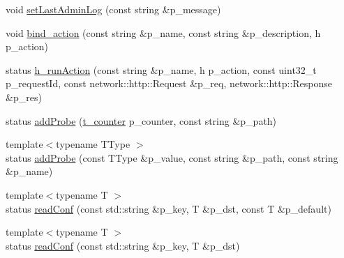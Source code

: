 \begin{DoxyCompactItemize}
\item 
void \hyperlink{classxtd_1_1servers_1_1app_1_1HttpServer_a9247cbc7930939b40df98a20167007c3}{set\+Last\+Admin\+Log} (const string \&p\+\_\+message)
\item 
void \hyperlink{classxtd_1_1servers_1_1app_1_1HttpServer_a981ab09b5f746a0cb7372816aede1115}{bind\+\_\+action} (const string \&p\+\_\+name, const string \&p\+\_\+description, h p\+\_\+action)
\item 
status \hyperlink{classxtd_1_1servers_1_1app_1_1HttpServer_a89a77d0dd8391a54b9560d2a32ab5ec6}{h\+\_\+run\+Action} (const string \&p\+\_\+name, h p\+\_\+action, const uint32\+\_\+t p\+\_\+request\+Id, const network\+::http\+::\+Request \&p\+\_\+req, network\+::http\+::\+Response \&p\+\_\+res)
\item 
status \hyperlink{classxtd_1_1servers_1_1app_1_1HttpServer_a0ff20a40a0e31dbb1e82be87be0e255f}{add\+Probe} (\hyperlink{classxtd_1_1servers_1_1app_1_1HttpServer_aaef467afe1f5191f38758088615c09c0}{t\+\_\+counter} p\+\_\+counter, const string \&p\+\_\+path)
\item 
{\footnotesize template$<$typename T\+Type $>$ }\\status \hyperlink{classxtd_1_1servers_1_1app_1_1HttpServer_a6126daf3a088048921d4e809231c3716}{add\+Probe} (const T\+Type \&p\+\_\+value, const string \&p\+\_\+path, const string \&p\+\_\+name)
\item 
{\footnotesize template$<$typename T $>$ }\\status \hyperlink{classxtd_1_1servers_1_1app_1_1HttpServer_ae1cffd988b56081fba6f124e9f0743fd}{read\+Conf} (const std\+::string \&p\+\_\+key, T \&p\+\_\+dst, const T \&p\+\_\+default)
\item 
{\footnotesize template$<$typename T $>$ }\\status \hyperlink{classxtd_1_1servers_1_1app_1_1HttpServer_abe54ee996274b1f6d4a89d29bba56ae8}{read\+Conf} (const std\+::string \&p\+\_\+key, T \&p\+\_\+dst)
\end{DoxyCompactItemize}
